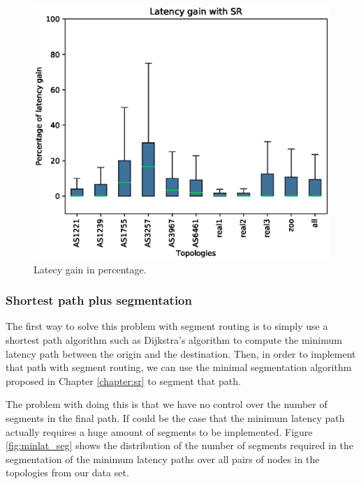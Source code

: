 \begin{figure}
\begin{center}
\includegraphics[scale=0.6]{./Network-lib/data/plot/minLat.eps}
\end{center}
\caption{Latecy gain in percentage.}
\label{fig:minlat_box}
\end{figure}

\subsubsection{Shortest path plus segmentation}

The first way to solve this problem with segment routing is to simply use a shortest path algorithm such as Dijkstra's algorithm
to compute the minimum latency path between the origin and the destination. Then, in order to implement that path with segment routing,
we can use the minimal segmentation algorithm proposed in Chapter \ref{chapter:sr} to segment that path.

The problem with doing this is that we have no control over the number of segments in the final path. If could be the case that the
minimum latency path actually requires a huge amount of segments to be implemented. Figure \ref{fig:minlat_seg} shows the distribution of
the number of segments required in the segmentation of the minimum latency paths over all pairs of nodes in the topologies from
our data set.

